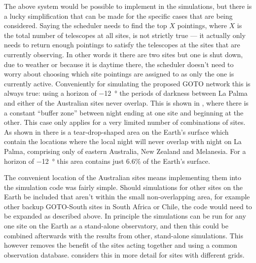 \begin{colsection}
\begin{colsection}
The above system would be possible to implement in the simulations, but there is a lucky simplification that can be made for the specific cases that are being considered. Saying the scheduler needs to find the top $X$ pointings, where $X$ is the total number of telescopes at all sites, is not strictly true --- it actually only needs to return enough pointings to satisfy the telescopes at the sites that are currently observing. In other words it there are two sites but one is shut down, due to weather or because it is daytime there, the scheduler doesn't need to worry about choosing which site pointings are assigned to as only the one is currently active. Conveniently for simulating the proposed GOTO network this is always true: using a horizon of \SI{-12}{\degree} the periods of darkness between La Palma and either of the Australian sites never overlap. This is shown in , where there is a constant ``buffer zone'' between night ending at one site and beginning at the other. This case only applies for a very limited number of combinations of sites. As shown in  there is a tear-drop-shaped area on the Earth's surface which contain the locations where the local night will never overlap with night on La Palma, comprising only of eastern Australia, New Zealand and Melanesia. For a horizon of \SI{-12}{\degree} this area contains just $6.6 \%$ of the Earth's surface.

The convenient location of the Australian sites means implementing them into the simulation code was fairly simple. Should simulations for other sites on the Earth be included that aren't within the small non-overlapping area, for example other backup GOTO-South sites in South Africa or Chile, the code would need to be expanded as described above. In principle the simulations can be run for any one site on the Earth as a stand-alone observatory, and then this could be combined afterwards with the results from other, stand-alone simulations. This however removes the benefit of the sites acting together and using a common observation database.  considers this in more detail for sites with different grids.


\end{colsection}
\end{colsection}
